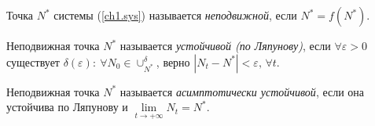 \begin{definition}
Точка $N^*$ системы (\ref{ch1.sys}) называется \textit{неподвижной}, если $N^* = f(N^*)$.
\end{definition}


\begin{definition}
Неподвижная точка $N^*$ называется \textit{устойчивой (по Ляпунову)}, если $\forall \varepsilon > 0$ существует $\delta(\varepsilon): \: \forall N_0 \in \cup^\delta_{N^*}$, верно $|N_t - N^*| < \varepsilon, \, \forall t$.
\end{definition}

\begin{definition}
Неподвижная точка $N^*$ называется \textit{асимптотически устойчивой}, если она устойчива по Ляпунову и $\lim\limits_{t \to + \infty} N_t = N^*$.
\end{definition}

